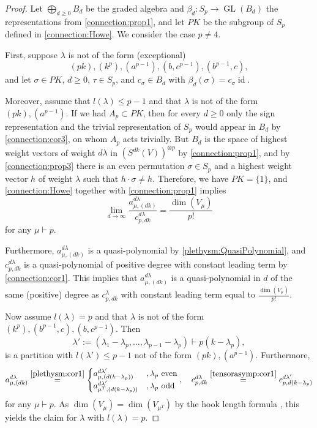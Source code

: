 \documentclass[a4paper]{amsart}
\DeclareMathOperator{\GL}{\mathrm{GL}}
\DeclareMathOperator{\id}{\mathrm{id}}
\begin{document}
\begin{proof}
	Let $\bigoplus_{d\geq 0}B_d$ be the graded algebra and $\beta_d:S_p\to\GL(B_d)$ the representations from \cref{connection:prop1},
	and let $PK$ be the subgroup of $S_p$ defined in \cref{connection:Howe}.
	We consider the case $p\neq 4$.

	First, suppose $\lambda$ is not of the form (\glqq exceptional\grqq)
	\begin{displaymath}
		(pk),(k^{p}),(a^{p-1}),(b,c^{p-1}),(b^{p-1},c),
	\end{displaymath}
	and let $\sigma\in PK$, $d\geq0$, $\tau\in S_p$,
	and $c_\sigma\in B_d$ with $\beta_d(\sigma)=c_\sigma\id$.
	
	Moreover, assume that $l(\lambda)\leq p-1$ and that $\lambda$ is not of the form $(pk),(a^{p-1})$.
	If we had $A_p\subset PK$,
	then for every $d\geq0$ only the sign representation and the trivial representation of $S_p$ would appear in $B_d$ by \cref{connection:cor3},
	on whom $A_p$ acts trivially.
	But $B_d$ is the space of highest weight vectors of weight $d\lambda$ in $(S^{dk}(V))^{\otimes p}$ by \cref{connection:prop1},
	and by \cref{connection:prop3} there is an even permutation $\sigma\in S_p$ and a highest weight vector $h$ of weight $\lambda$ such that $h\cdot\sigma\neq h$.	
	Therefore, we have $PK=\{1\}$,
	and \cref{connection:Howe} together with \cref{connection:prop1} implies
	\begin{displaymath}
		\lim\limits_{d\to\infty}\frac{a_{\mu,(dk)}^{d\lambda}}{c_{p,dk}^{d\lambda}}=\frac{\dim(V_\mu)}{p!}
	\end{displaymath}
	for any $\mu\vdash p$.
	
	Furthermore, $a_{\mu,(dk)}^{d\lambda}$ is a quasi-polynomial by \cref{plethysm:QuasiPolynomial},
	and $c_{p,dk}^{d\lambda}$ is a quasi-polynomial of positive degree with constant leading term by \cref{connection:cor1}.
	This implies that $a_{\mu,(dk)}^{d\lambda}$ is a quasi-polynomial in $d$ of the same (positive) degree as $c_{p,dk}^\lambda$ with constant leading term equal to $\frac{\dim(V_\mu)}{p!}$.
	
	Now assume $l(\lambda)=p$ and that $\lambda$ is not of the form $(k^p),(b^{p-1},c),(b,c^{p-1})$.
	Then
	\begin{displaymath}
		\lambda':=(\lambda_1-\lambda_p,\ldots,\lambda_{p-1}-\lambda_p)\vdash p(k-\lambda_p),
	\end{displaymath}
	is a partition with $l(\lambda')\leq p-1$ not of the form $(pk),(a^{p-1})$.
	Furthermore,
	\begin{displaymath}
		a_{\mu,(dk)}^{d\lambda}\overset{\cref{plethysm:cor1}}{=}
		\begin{cases}
			a_{\mu,(d(k-\lambda_p))}^{d\lambda'}&,\lambda_p\mathrm{\ even}\\
			a_{\mu^T,(d(k-\lambda_p))}^{d\lambda'}&,\lambda_p\mathrm{\ odd}
		\end{cases},\quad
		c_{p,dk}^{d\lambda}\overset{\cref{tensorasymp:cor1}}{=}
		c_{p,d(k-\lambda_p)}^{d\lambda'}
	\end{displaymath}
	for any $\mu\vdash p$.
	As $\dim(V_\mu)=\dim(V_{\mu^T})$ by the hook length formula \cite[4.12]{FH04},
	this yields the claim for $\lambda$ with $l(\lambda)=p$.
	

\end{proof}
\end{document}
